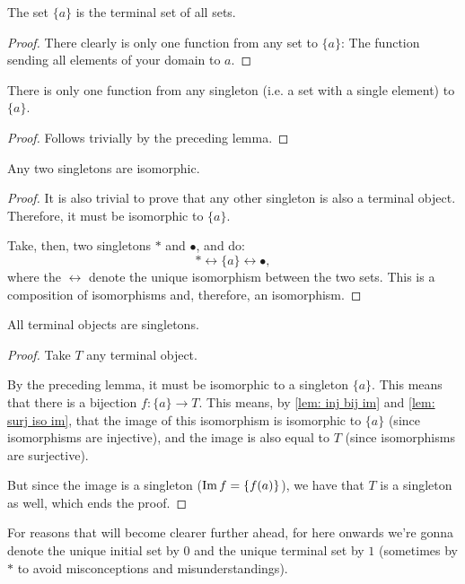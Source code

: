 \begin{lemma}
	The set $\{a\}$ is the terminal set of all sets.
\end{lemma}
\begin{proof}
	There clearly is only one function from any set to $\{a\}$: The function sending all elements of your domain to $a$.
\end{proof}
\begin{cor}
	There is only one function from any singleton (i.e. a set with a single element) to $\{a\}$.
\end{cor}
\begin{proof}
	Follows trivially by the preceding lemma.
\end{proof}
\begin{cor}
	Any two singletons are isomorphic.
\end{cor}
\begin{proof}
	It is also trivial to prove that any other singleton is also a terminal object. Therefore, it must be isomorphic to $\{a\}$.
	
	Take, then, two singletons $*$ and $\bullet$, and do:
	\[*\leftrightarrow\{a\}\leftrightarrow\bullet,\]where the $\leftrightarrow$ denote the unique isomorphism between the two sets. This is a composition of isomorphisms and, therefore, an isomorphism.
\end{proof}
\begin{cor}
	All terminal objects are singletons.
\end{cor}
\begin{proof}
	Take $T$ any terminal object.
	
	By the preceding lemma, it must be isomorphic to a singleton $\{a\}$. This means that there is a bijection $f:\{a\}\to T$. This means, by \cref{lem: inj bij im} and \cref{lem: surj iso im}, that the image of this isomorphism is isomorphic to $\{a\}$ (since isomorphisms are injective), and the image is also equal to $T$ (since isomorphisms are surjective).
	
	But since the image is a singleton ($\operatorname{Im} f=\{f(a)\}$), we have that $T$ is a singleton as well, which ends the proof.
\end{proof}

\begin{rmk}
	For reasons that will become clearer further ahead, for here onwards we're gonna denote the unique initial set by $0$ and the unique terminal set by $1$ (sometimes by $*$ to avoid misconceptions and misunderstandings).
\end{rmk}

